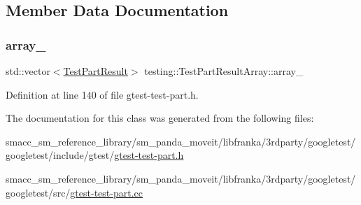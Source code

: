 \subsection{Member Data Documentation}
\mbox{\label{classtesting_1_1TestPartResultArray_a288da4fd16773d079722d6824a63060f}} 
\subsubsection{\texorpdfstring{array\+\_\+}{array\_}}
{\footnotesize\ttfamily std\+::vector$<$\hyperlink{classtesting_1_1TestPartResult}{Test\+Part\+Result}$>$ testing\+::\+Test\+Part\+Result\+Array\+::array\+\_\+\hspace{0.3cm}{\ttfamily [private]}}



Definition at line 140 of file gtest-\/test-\/part.\+h.



The documentation for this class was generated from the following files\+:\begin{DoxyCompactItemize}
\item 
smacc\+\_\+sm\+\_\+reference\+\_\+library/sm\+\_\+panda\+\_\+moveit/libfranka/3rdparty/googletest/googletest/include/gtest/\hyperlink{gtest-test-part_8h}{gtest-\/test-\/part.\+h}\item 
smacc\+\_\+sm\+\_\+reference\+\_\+library/sm\+\_\+panda\+\_\+moveit/libfranka/3rdparty/googletest/googletest/src/\hyperlink{gtest-test-part_8cc}{gtest-\/test-\/part.\+cc}\end{DoxyCompactItemize}
